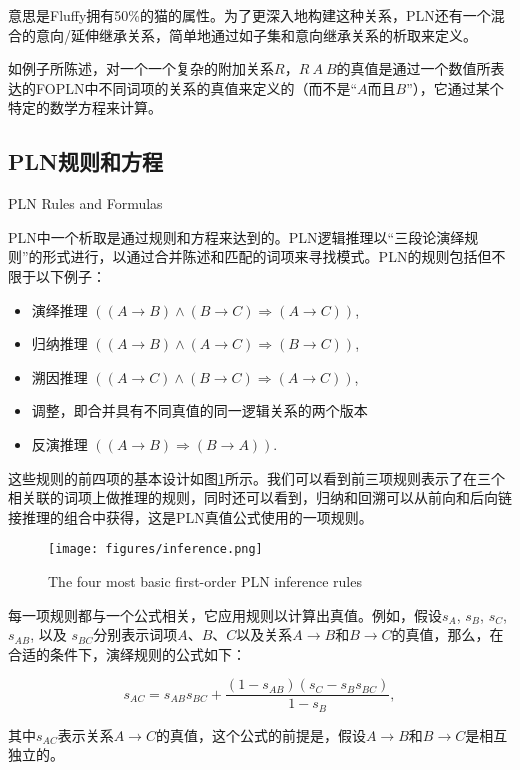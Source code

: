 意思是Fluffy拥有50\%的猫的属性。为了更深入地构建这种关系，PLN还有一个混合的意向/延伸继承关系，简单地通过如子集和意向继承关系的析取来定义。

如例子所陈述，对一个一个复杂的附加关系$R$，$R \ A \ B$的真值是通过一个数值所表达的FOPLN中不同词项的关系的真值来定义的（而不是“$A$而且$B$”），它通过某个特定的数学方程来计算。

\subsection{PLN规则和方程}{PLN Rules and Formulas}

PLN中一个析取是通过规则和方程来达到的。PLN逻辑推理以“三段论演绎规则”的形式进行，以通过合并陈述和匹配的词项来寻找模式。PLN的规则包括但不限于以下例子：

\begin{itemize}
\item 演绎推理 $\left((A\rightarrow B) \wedge (B\rightarrow C) \Rightarrow (A\rightarrow C)\right)$,
\item 归纳推理 $\left((A\rightarrow B) \wedge (A\rightarrow C) \Rightarrow
(B\rightarrow C)\right)$,
\item  溯因推理  $\left((A\rightarrow C) \wedge (B\rightarrow C) \Rightarrow
(A\rightarrow C)\right)$,
  \item 调整，即合并具有不同真值的同一逻辑关系的两个版本
\item 反演推理 $\left((A\rightarrow B) \Rightarrow
  (B\rightarrow A)\right)$.
\end{itemize}

这些规则的前四项的基本设计如图\ref{fig:inference}所示。我们可以看到前三项规则表示了在三个相关联的词项上做推理的规则，同时还可以看到，归纳和回溯可以从前向和后向链接推理的组合中获得，这是PLN真值公式使用的一项规则。

\begin{figure}[htb]
  \center
  \texttt{[image: figures/inference.png]}
  \caption{The four most basic first-order PLN inference rules}
  \label{fig:inference}
\end{figure}

每一项规则都与一个公式相关，它应用规则以计算出真值。例如，假设$s_A$, $s_B$, $s_C$, $s_{AB}$, 以及 $s_{BC}$分别表示词项$A$、$B$、$C$以及关系$A\rightarrow B$和$B\rightarrow C$的真值，那么，在合适的条件下，演绎规则的公式如下：

$$s_{AC}=s_{AB}s_{BC}+\frac{\left(1-s_{AB}\right)\left(s_C-s_Bs_{BC}\right)}{1-s_B},$$

其中$s_{AC}$表示关系$A\rightarrow C$的真值，这个公式的前提是，假设$A\rightarrow B$和$B\rightarrow C$是相互独立的。


